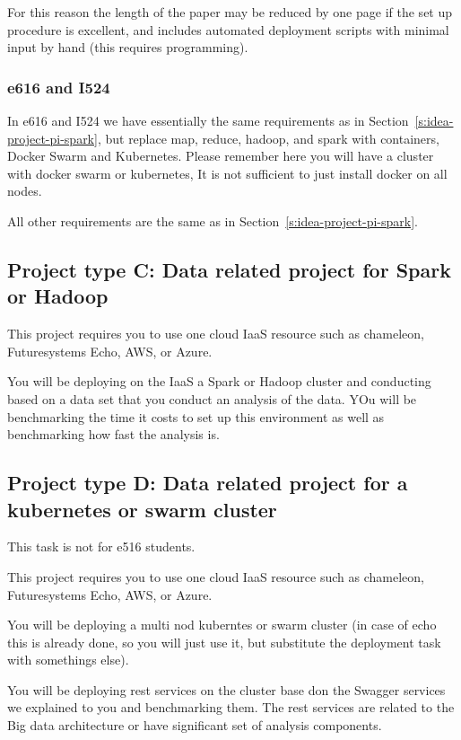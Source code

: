 For this reason the length of the paper may be reduced by one page if
the set up procedure is excellent, and includes automated deployment
scripts with minimal input by hand (this requires programming).


\subsubsection{e616 and I524}

In e616 and I524 we have essentially the same requirements as in
Section~\ref{s:idea-project-pi-spark}, but
replace map, reduce, hadoop, and spark with containers, Docker Swarm
and Kubernetes. Please remember here you will have a cluster with
docker swarm or kubernetes, It is not sufficient to just install
docker on all nodes.

All other requirements are the same as in Section~\ref{s:idea-project-pi-spark}. 



\subsection{Project type C: Data related project for Spark or Hadoop}

This project requires you to use one cloud IaaS resource such as
chameleon, Futuresystems Echo, AWS, or Azure.

You will be deploying on the IaaS a Spark or Hadoop cluster and
conducting based on a data set that you conduct an analysis of the
data. YOu will be benchmarking the time it costs to set up this
environment as well as benchmarking how fast the analysis is. 

\subsection{Project type D: Data related project for a kubernetes or
  swarm cluster}

This task is not for e516 students.

This project requires you to use one cloud IaaS resource such as
chameleon, Futuresystems Echo, AWS, or Azure.

You will be deploying a multi nod kuberntes or swarm cluster (in case
of echo this is already done, so you will just use it, but substitute
the deployment task with somethings else). 

You will be deploying rest services on the cluster base don the
Swagger services we explained to you and benchmarking them. The rest
services are related to the Big data architecture or have significant
set of analysis components. 

